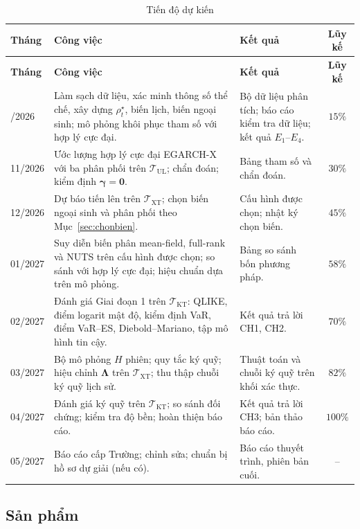 \documentclass[12pt,a4paper]{article}
\theoremstyle{definition}
\theoremstyle{remark}
\newcommand{\bgamma}{\boldsymbol{\gamma}}
\newcommand{\bLambda}{\boldsymbol{\Lambda}}
\begin{document}
\begin{longtable}{@{}p{1.5cm}p{7.9cm}p{3.6cm}c@{}}
\caption{Tiến độ dự kiến}\label{tab:tiendo}\\
\toprule
\textbf{Tháng} & \textbf{Công việc} & \textbf{Kết quả} & \textbf{Lũy kế} \\
\midrule
\endfirsthead
\toprule
\textbf{Tháng} & \textbf{Công việc} & \textbf{Kết quả} & \textbf{Lũy kế} \\
\midrule
\endhead
\bottomrule
\endfoot
10/2026 & Làm sạch dữ liệu, xác minh thông số thể chế, xây dựng $\rho^{\star}_t$, biến lịch, biến ngoại sinh; mô phỏng khôi phục tham số với hợp lý cực đại. & Bộ dữ liệu phân tích; báo cáo kiểm tra dữ liệu; kết quả $E_1$--$E_4$. & $15\%$ \\
11/2026 & Ước lượng hợp lý cực đại EGARCH-X với ba phân phối trên $\mathcal T_{\mathrm{UL}}$; chẩn đoán; kiểm định $\bgamma=\mathbf 0$. & Bảng tham số và chẩn đoán. & $30\%$ \\
12/2026 & Dự báo tiến lên trên $\mathcal T_{\mathrm{XT}}$; chọn biến ngoại sinh và phân phối theo Mục~\ref{sec:chonbien}. & Cấu hình được chọn; nhật ký chọn biến. & $45\%$ \\
01/2027 & Suy diễn biến phân mean-field, full-rank và NUTS trên cấu hình được chọn; so sánh với hợp lý cực đại; hiệu chuẩn dựa trên mô phỏng. & Bảng so sánh bốn phương pháp. & $58\%$ \\
02/2027 & Đánh giá Giai đoạn 1 trên $\mathcal T_{\mathrm{KT}}$: QLIKE, điểm logarit mật độ, kiểm định VaR, điểm VaR--ES, Diebold--Mariano, tập mô hình tin cậy. & Kết quả trả lời CH1, CH2. & $70\%$ \\
03/2027 & Bộ mô phỏng $H$ phiên; quy tắc ký quỹ; hiệu chỉnh $\bLambda$ trên $\mathcal T_{\mathrm{XT}}$; thu thập chuỗi ký quỹ lịch sử. & Thuật toán và chuỗi ký quỹ trên khối xác thực. & $82\%$ \\
04/2027 & Đánh giá ký quỹ trên $\mathcal T_{\mathrm{KT}}$; so sánh đối chứng; kiểm tra độ bền; hoàn thiện báo cáo. & Kết quả trả lời CH3; bản thảo báo cáo. & $100\%$ \\
05/2027 & Báo cáo cấp Trường; chỉnh sửa; chuẩn bị hồ sơ dự giải (nếu có). & Báo cáo thuyết trình, phiên bản cuối. & -- \\
\end{longtable}

\subsection{Sản phẩm}
\end{document}
